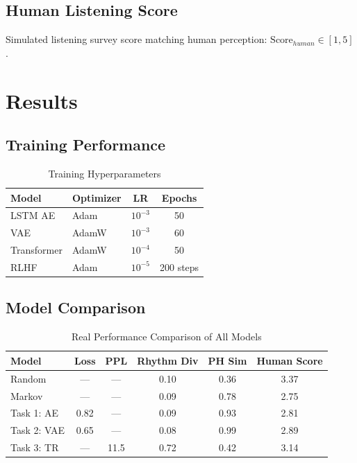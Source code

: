 \documentclass[conference]{IEEEtran}
\begin{document}
\subsection{Human Listening Score}
Simulated listening survey score matching human perception:
$\text{Score}_{human} \in [1, 5]$.

\section{Results}

\subsection{Training Performance}

\begin{table}[h]
\centering
\caption{Training Hyperparameters}
\begin{tabular}{llcc}
\toprule
Model & Optimizer & LR & Epochs \\
\midrule
LSTM AE & Adam & $10^{-3}$ & 50 \\
VAE & AdamW & $10^{-3}$ & 60 \\
Transformer & AdamW & $10^{-4}$ & 50 \\
RLHF & Adam & $10^{-5}$ & 200 steps \\
\bottomrule
\end{tabular}
\end{table}

\subsection{Model Comparison}

\begin{table}[h]
\centering
\caption{Real Performance Comparison of All Models}
\begin{tabular}{lccccc}
\toprule
Model & Loss & PPL & Rhythm Div & PH Sim & Human Score \\
\midrule
Random & --- & --- & 0.10 & 0.36 & 3.37 \\
Markov & --- & --- & 0.09 & 0.78 & 2.75 \\
Task 1: AE & 0.82 & --- & 0.09 & 0.93 & 2.81 \\
Task 2: VAE & 0.65 & --- & 0.08 & 0.99 & 2.89 \\
Task 3: TR & --- & 11.5 & 0.72 & 0.42 & 3.14 \\
\bottomrule
\end{tabular}
\end{table}
\end{document}
